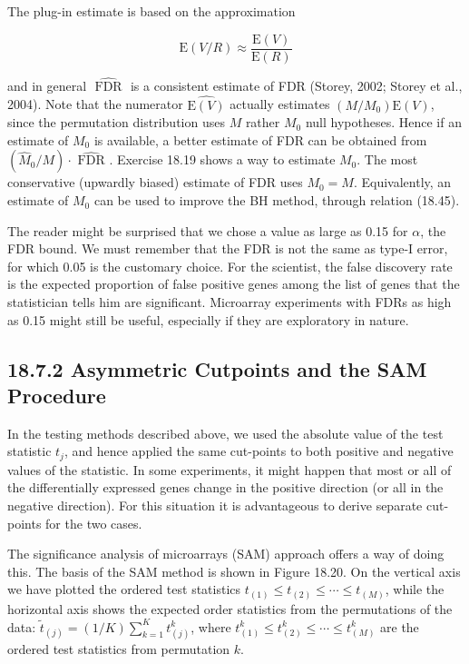 \documentclass[10pt]{article}
\begin{document}
The plug-in estimate is based on the approximation


\begin{equation*}
\mathrm{E}(V / R) \approx \frac{\mathrm{E}(V)}{\mathrm{E}(R)} \tag{18.47}
\end{equation*}


and in general $\widehat{\text { FDR }}$ is a consistent estimate of FDR (Storey, 2002; Storey et al., 2004). Note that the numerator $\widehat{\mathrm{E}(V)}$ actually estimates $\left(M / M_{0}\right) \mathrm{E}(V)$,\\
since the permutation distribution uses $M$ rather $M_{0}$ null hypotheses. Hence if an estimate of $M_{0}$ is available, a better estimate of FDR can be obtained from $\left(\hat{M}_{0} / M\right) \cdot \widehat{\text { FDR }}$. Exercise 18.19 shows a way to estimate $M_{0}$. The most conservative (upwardly biased) estimate of FDR uses $M_{0}=M$. Equivalently, an estimate of $M_{0}$ can be used to improve the BH method, through relation (18.45).

The reader might be surprised that we chose a value as large as 0.15 for $\alpha$, the FDR bound. We must remember that the FDR is not the same as type-I error, for which 0.05 is the customary choice. For the scientist, the false discovery rate is the expected proportion of false positive genes among the list of genes that the statistician tells him are significant. Microarray experiments with FDRs as high as 0.15 might still be useful, especially if they are exploratory in nature.

\subsection*{18.7.2 Asymmetric Cutpoints and the SAM Procedure}
In the testing methods described above, we used the absolute value of the test statistic $t_{j}$, and hence applied the same cut-points to both positive and negative values of the statistic. In some experiments, it might happen that most or all of the differentially expressed genes change in the positive direction (or all in the negative direction). For this situation it is advantageous to derive separate cut-points for the two cases.

The significance analysis of microarrays (SAM) approach offers a way of doing this. The basis of the SAM method is shown in Figure 18.20. On the vertical axis we have plotted the ordered test statistics $t_{(1)} \leq t_{(2)} \leq \cdots \leq t_{(M)}$, while the horizontal axis shows the expected order statistics from the permutations of the data: $\tilde{t}_{(j)}=(1 / K) \sum_{k=1}^{K} t_{(j)}^{k}$, where $t_{(1)}^{k} \leq t_{(2)}^{k} \leq \cdots \leq t_{(M)}^{k}$ are the ordered test statistics from permutation $k$.
\end{document}
